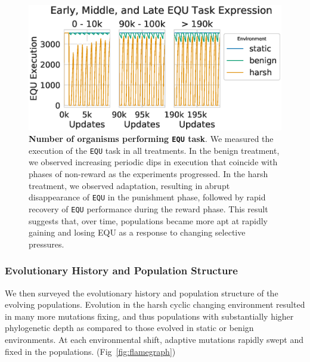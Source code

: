 \documentclass[10pt,letterpaper,final]{article}
\begin{document}
	\begin{figure}[!h]
	\includegraphics[width=0.95\columnwidth]{figures/CE/fig2.eps}
	\caption{\textbf{Number of organisms performing \texttt{EQU} task}. We measured the execution of the \texttt{EQU} task in all treatments. In the benign treatment, we observed increasing periodic dips in execution that coincide with phases of non-reward as the experiments progressed. In the harsh treatment, we observed adaptation, resulting in abrupt disappearance of \texttt{EQU} in the punishment phase, followed by rapid recovery of \texttt{EQU} performance during the reward phase. This result suggests that, over time, populations became more apt at rapidly gaining and losing EQU as a response to changing selective pressures.
	}
	\label{fig:CCE_equ_execution} %
	\end{figure}

\subsubsection*{Evolutionary History and Population Structure}
We then surveyed the evolutionary history and population structure of the evolving populations. Evolution in the harsh cyclic changing environment resulted in many more mutations fixing, and thus populations with substantially higher phylogenetic depth as compared to those evolved in static or benign environments. At each environmental shift, adaptive mutations rapidly swept and fixed in the populations. (Fig~\ref{fig:flamegraph})
\end{document}

